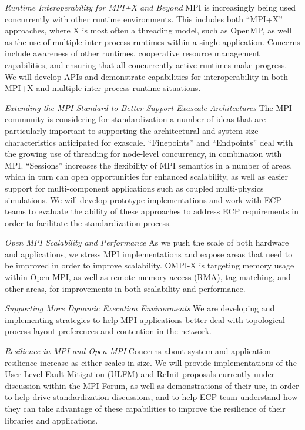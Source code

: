 \emph{Runtime Interoperability for MPI+X and Beyond} MPI is
increasingly being used concurrently with other runtime environments.
This includes both ``MPI+X'' approaches, where X
is most often a threading model, such as OpenMP, as
well as the use of multiple inter-process runtimes within a single
application.  Concerns include awareness of other runtimes,
cooperative resource management capabilities, and ensuring that all
concurrently active runtimes make progress.  We will develop APIs and
demonstrate capabilities for interoperability in both MPI+X and
multiple inter-process runtime situations.

\emph{Extending the MPI Standard to Better Support Exascale
Architectures} The MPI community is considering for standardization a
number of ideas that 
are particularly important to supporting
the architectural and system size characteristics anticipated for
exascale.  ``Finepoints'' and ``Endpoints''
deal
with the growing use of threading for node-level concurrency, in
combination with MPI.  ``Sessions'' increases the flexibility of MPI
semantics in a number of areas, which in turn can open opportunities
for enhanced scalability, as well as easier support for
multi-component applications such as coupled multi-physics
simulations.  We will develop prototype implementations and work with
ECP teams to evaluate the ability of these approaches to address ECP
requirements in order to facilitate the standardization process.

\emph{Open MPI Scalability and Performance} As we push the scale of
both hardware and applications, we stress MPI implementations and
expose areas that need to be improved in order to improve scalability.
OMPI-X is targeting memory usage within Open MPI, as well as remote
memory access (RMA), tag matching, and other areas, for improvements
in both scalability and performance.

\emph{Supporting More Dynamic Execution Environments} We are
developing and implementing strategies to help MPI applications
better deal with topological process layout preferences
and contention in the network.

\emph{Resilience in MPI and Open MPI} Concerns about system and
application resilience increase as either scales in size.
We will provide implementations of the
User-Level Fault Mitigation (ULFM) and ReInit proposals currently
under discussion within the MPI Forum, as well as demonstrations of
their use, in order to help drive standardization discussions, and to
help ECP team understand how they can take advantage of these
capabilities to improve the resilience of their libraries and
applications.

